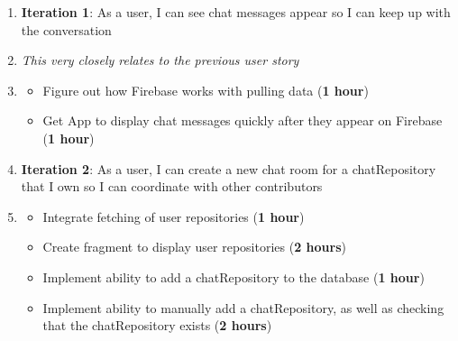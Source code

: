 \documentclass{report}
\begin{document}
\begin{enumerate}
    \item \textbf{Iteration 1}: As a user, I can see chat messages appear so I can keep up with the conversation
    \item[] \textit{This very closely relates to the previous user story}
    \item[] \begin{itemize}
        \item Figure out how Firebase works with pulling data (\textbf{1 hour})
        \item Get App to display chat messages quickly after they appear on Firebase (\textbf{1 hour})
    \end{itemize}
    \item \textbf{Iteration 2}: As a user, I can create a new chat room for a chatRepository that I own so I can coordinate with other contributors
    \item[] \begin{itemize}
        \item Integrate fetching of user repositories (\textbf{1 hour})
        \item Create fragment to display user repositories (\textbf{2 hours})
        \item Implement ability to add a chatRepository to the database (\textbf{1 hour})
        \item Implement ability to manually add a chatRepository, as well as checking that the chatRepository exists (\textbf{2 hours})
    \end{itemize}


\end{enumerate}
\end{document}
